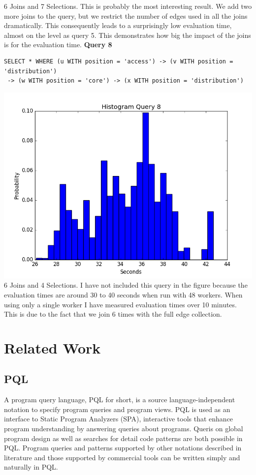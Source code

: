 \documentclass[11pt,singlecolumn]{scrartcl}
\begin{document}
6 Joins and 7 Selections. This is probably the most interesting result. We add two more joins to the query, but we restrict the number of edges used in all the joins dramatically. This consequently leads to a surprisingly low evaluation time, almost on the level as query 5. This demonstrates how big the impact of the joins is for the evaluation time.
\clearpage
\textbf{Query 8}\\
\begin{verbatim}
SELECT * WHERE (u WITH position = 'access') -> (v WITH position = 'distribution')
 -> (w WITH position = 'core') -> (x WITH position = 'distribution')\end{verbatim}
\includegraphics[width=1\textwidth]{q81}
6 Joins and 4 Selections. I have not included this query in the figure because the evaluation times are around 30 to 40 seconds when run with 48 workers. When using only a single worker I have measured evaluation times over 10 minutes. This is due to the fact that we join 6 times with the full edge collection.
\clearpage

\section{Related Work}


\subsection{PQL}
A program query language, PQL for short, is a source language-independent notation to specify program queries and program views. PQL is used as an interface to Static Program Analyzers (SPA), interactive tools that enhance program understanding by answering queries about programs. Queris on global program design as well as searches for detail code patterns are both possible in PQL. Program queries and patterns supported by other notations described in literature and those supported by commercial tools can be written simply and naturally in PQL.\cite {PQL}
\end{document}
